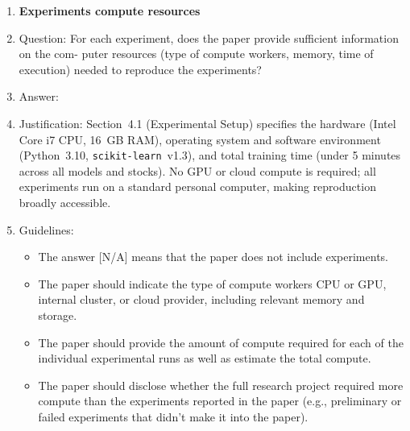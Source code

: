 \documentclass{article}
\begin{document}
\begin{enumerate}
\item {\bf Experiments compute resources}
    \item[] Question: For each experiment, does the paper provide sufficient information on the com-
puter resources (type of compute workers, memory, time of execution) needed to reproduce
the experiments?
    \item[] Answer: \answerYes{}
    \item[] Justification: Section~4.1 (Experimental Setup) specifies the hardware (Intel Core
    i7 CPU, 16~GB RAM), operating system and software environment (Python~3.10,
    \texttt{scikit-learn}~v1.3), and total training time (under 5 minutes across all models and
    stocks). No GPU or cloud compute is required; all experiments run on a standard personal
    computer, making reproduction broadly accessible.
    \item[] Guidelines:
    \begin{itemize}
        \item The answer [N/A] means that the paper does not include experiments.
        \item The paper should indicate the type of compute workers CPU or GPU, internal cluster,
or cloud provider, including relevant memory and storage.
        \item The paper should provide the amount of compute required for each of the individual
experimental runs as well as estimate the total compute.
        \item The paper should disclose whether the full research project required more compute
than the experiments reported in the paper (e.g., preliminary or failed experiments that
didn't make it into the paper).
    \end{itemize}


\end{enumerate}
\end{document}

